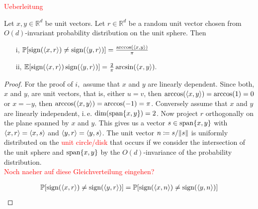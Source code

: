 \textcolor{red}{Ueberleitung}

\begin{lemma}\label{lem:G_id}
	Let $x,y\in\mathbb{R}^d$ be unit vectors. Let $r\in\mathbb{R}^d$ be a random unit vector chosen from $O(d)$-invariant probability distribution on the unit sphere. Then
	\begin{enumerate}
		\item[i,] $\mathbb{P}[\operatorname{sign}(\langle{x},{r}\rangle)\neq\operatorname{sign}(\langle{y},{r}\rangle)]=\frac{\arccos(\langle{x},{y}\rangle)}{\pi}$
		\item[ii,] $\mathbb{E}[\operatorname{sign}(\langle{x},{r}\rangle)\operatorname{sign}(\langle{y},{r}\rangle)]=\frac{2}{\pi}\arcsin(\langle{x},{y}\rangle).$
	\end{enumerate}
\end{lemma}
\begin{proof}
	For the proof of $i,$ assume that $x$ and $y$ are linearly dependent. Since both, $x$ and $y$, are unit vectors, that is, either $u=v$, then $\arccos(\langle{x},{y}\rangle) = \arccos(1)=0$ or $x=-y$, then $\arccos(\langle{x},{y}\rangle) = \arccos(-1) = \pi$.
	Conversely assume that $x$ and $y$ are linearly independent, i.\,e. $\operatorname{dim}(\operatorname{span}\{x,y\})=2$. Now project $r$ orthogonally on the plane spanned by $x$ and $y$. This gives us a vector $s\in \operatorname{span}\{x,y\}$ with $\langle{x},{r}\rangle = \langle{x},{s}\rangle$ and $\langle{y},{r}\rangle = \langle{y},{s}\rangle$. The unit vector $n\coloneqq s/ \Vert {s} \Vert$ is uniformly distributed on the \textcolor{red}{unit circle/disk} that occurs if we consider the intersection of the unit sphere and $\operatorname{span}\{x,y\}$ by the $O(d)$-invariance of the probability distribution. \\
	
	\textcolor{red}{Noch naeher auf diese Gleichverteilung eingehen?}
	
	\begin{align*}
		\mathbb{P}[\operatorname{sign}(\langle{x},{r}\rangle)\neq\operatorname{sign}(\langle{y},{r}\rangle)]= \mathbb{P}[\operatorname{sign}(\langle{x},{n}\rangle)\neq\operatorname{sign}(\langle{y},{n}\rangle)] 
	\end{align*} 
	

\end{proof}
